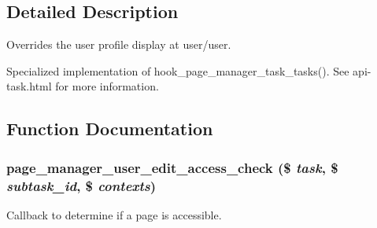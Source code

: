 \subsection{Detailed Description}
Overrides the user profile display at user/user.

Specialized implementation of hook\_\-page\_\-manager\_\-task\_\-tasks(). See api-\/task.html for more information. 

\subsection{Function Documentation}
\hypertarget{page__manager_2plugins_2tasks_2user__edit_8inc_ab50a9d4e709806fca20037b4ef199fa3}{
\subsubsection[{page\_\-manager\_\-user\_\-edit\_\-access\_\-check}]{\setlength{\rightskip}{0pt plus 5cm}page\_\-manager\_\-user\_\-edit\_\-access\_\-check (\$ {\em task}, \/  \$ {\em subtask\_\-id}, \/  \$ {\em contexts})}}
\label{page__manager_2plugins_2tasks_2user__edit_8inc_ab50a9d4e709806fca20037b4ef199fa3}
Callback to determine if a page is accessible.


